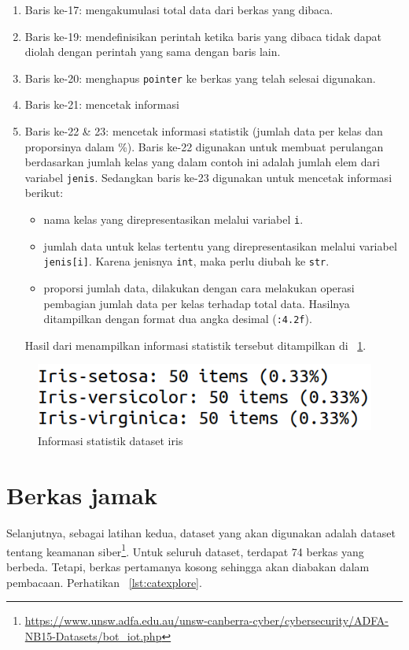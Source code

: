 \begin{enumerate}
  \item Baris ke-17: mengakumulasi total data dari berkas yang dibaca.
  \item Baris ke-19: mendefinisikan perintah ketika baris yang dibaca tidak dapat diolah dengan perintah yang sama dengan baris lain.
  \item Baris ke-20: menghapus \texttt{pointer} ke berkas yang telah selesai digunakan.
  \item Baris ke-21: mencetak informasi
  \item Baris ke-22 \& 23: mencetak informasi statistik (jumlah data per kelas dan proporsinya dalam \%). Baris ke-22 digunakan untuk membuat perulangan berdasarkan jumlah kelas yang dalam contoh ini adalah jumlah elem dari variabel \texttt{jenis}. Sedangkan baris ke-23 digunakan untuk mencetak informasi berikut:
  \begin{itemize}
     \item nama kelas yang direpresentasikan melalui variabel \texttt{i}.
     \item jumlah data untuk kelas tertentu yang direpresentasikan melalui variabel \texttt{jenis[i]}. Karena jenisnya \texttt{int}, maka perlu diubah ke \texttt{str}.
     \item proporsi jumlah data, dilakukan dengan cara melakukan operasi pembagian jumlah data per kelas terhadap total data. Hasilnya ditampilkan dengan format dua angka desimal (\texttt{:4.2f}).
   \end{itemize} 
   Hasil dari menampilkan informasi statistik tersebut ditampilkan di \figurename~\ref{fig:iristat}.
\end{enumerate}

\begin{figure}
  \begin{center}
    \includegraphics[scale=2]{pics/iristat.png}
    \caption{Informasi statistik dataset iris}
    \label{fig:iristat}
  \end{center}
\end{figure}

\section{Berkas jamak}
Selanjutnya, sebagai latihan kedua, dataset yang akan digunakan adalah dataset tentang keamanan siber\footnote{\url{https://www.unsw.adfa.edu.au/unsw-canberra-cyber/cybersecurity/ADFA-NB15-Datasets/bot\_iot.php}}. Untuk seluruh dataset, terdapat 74 berkas yang berbeda. Tetapi, berkas pertamanya kosong sehingga akan diabakan dalam pembacaan. Perhatikan \lstlistingname~\ref{lst:catexplore}.

